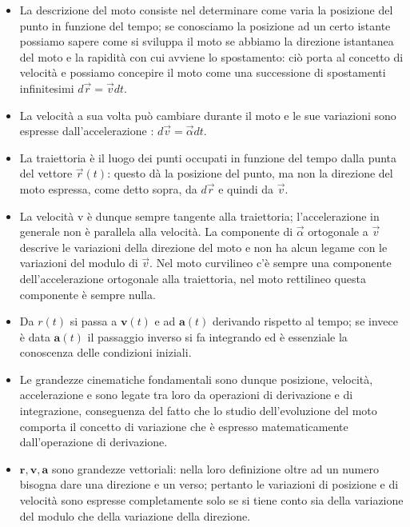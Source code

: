\documentclass[class=book, crop=false, oneside, 12pt]{standalone}
\begin{document}
\begin{itemize}
  \item La descrizione del moto consiste nel determinare come varia la posizione del punto in funzione del tempo; se conosciamo la posizione ad un certo istante possiamo sapere come si sviluppa il moto se abbiamo la direzione istantanea del moto e la rapidità con cui avviene lo spostamento: ciò porta al concetto di velocità e possiamo concepire il moto come una successione di spostamenti infinitesimi \(d \overrightarrow{r}= \overrightarrow{v} dt\).
  \item La velocità a sua volta può cambiare durante il moto e le sue variazioni sono espresse dall'accelerazione : \(d \overrightarrow{v} = \overrightarrow{\alpha} d t\).
  \item La traiettoria è il luogo dei punti occupati in funzione del tempo dalla punta del vettore \(\overrightarrow{r}(t)\): questo dà la posizione del punto, ma non la direzione del moto espressa, come detto sopra, da \(d \overrightarrow{r}\) e quindi da \(\overrightarrow{v}\).
  \item La velocità v è dunque sempre tangente alla traiettoria; l'accelerazione in generale non è parallela alla velocità. La componente di \(\overrightarrow{\alpha}\) ortogonale a \(\overrightarrow{v}\) descrive le variazioni della direzione del moto e non ha alcun legame con le variazioni del modulo di \(\overrightarrow{v}\). Nel moto curvilineo c'è sempre una componente dell'accelerazione ortogonale alla traiettoria, nel moto rettilineo questa componente è sempre nulla.
  \item Da \(r(t)\) si passa a \(\boldsymbol{v}(t)\) e ad \(\boldsymbol{a}(t)\) derivando rispetto al tempo; se invece è data \(\boldsymbol{a}(t)\) il passaggio inverso si fa integrando ed è essenziale la conoscenza delle condizioni iniziali.
  \item Le grandezze cinematiche fondamentali sono dunque posizione, velocità, accelerazione e sono legate tra loro da operazioni di derivazione e di integrazione, conseguenza del fatto che lo studio dell'evoluzione del moto comporta il concetto di variazione che è espresso matematicamente dall'operazione di derivazione.
  \item \(\mathbf{r}, \boldsymbol{v}, \boldsymbol{a}\) sono grandezze vettoriali: nella loro definizione oltre ad un numero bisogna dare una direzione e un verso; pertanto le variazioni di posizione e di velocità sono espresse completamente solo se si tiene conto sia della variazione del modulo che della variazione della direzione.

\end{itemize}
\end{document}
